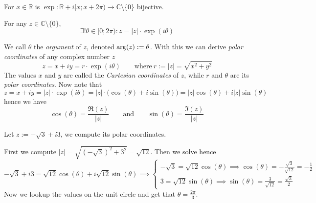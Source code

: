 \begin{theorem}
   For \(x \in \mathbb{R}\) is \(\exp: \mathbb{R} + i[x; x + 2\pi) \to \mathbb{C}\setminus\{0\}\) bijective.
\end{theorem}

\begin{theorem}
   For any \(z \in \mathbb{C}\setminus\{0\}\),
   \[\exists! \theta \in [0; 2\pi): z = \lvert z\rvert \cdot \exp(i \theta)\]
\end{theorem}
We call \(\theta\) the \emph{argument} of \(z\), denoted \(\operatorname{arg}(z) := \theta\).
With this we can derive \emph{polar coordinates} of any complex number \(z\)
\[z = x + iy = r \cdot \exp(i \theta) \qquad\text{where}~r := |z| = \sqrt{x^2 + y^2}\]
The values \(x\) and \(y\) are called the \emph{Cartesian coordinates} of \(z\), while \(r\) and \(\theta\) are its \emph{polar coordinates}.
Now note that
\[z = x + iy = \lvert z\rvert \cdot \exp(i \theta) = \lvert z \rvert \cdot \big(\cos(\theta) + i\sin(\theta)\big) = \lvert z\rvert\cos(\theta) + i\lvert z\rvert\sin(\theta)\]
hence we have
\[\cos(\theta) = \frac{\Re(z)}{\lvert z\rvert} \qquad\text{and}\qquad \sin(\theta) = \frac{\Im(z)}{\lvert z\rvert}\]
\begin{example}
   Let \(z := -\sqrt{3} + i3\), we compute its polar coordinates.

   First we compute \(\lvert z\rvert = \sqrt{(-\sqrt{3})^2 + 3^2} = \sqrt{12}\).
   Then we solve
   hence
   \[-\sqrt{3} + i3 = \sqrt{12}\cos(\theta) + i\sqrt{12}\sin(\theta) \implies \begin{cases}
         -\sqrt{3} = \sqrt{12}\cos(\theta) \implies \cos(\theta) = -\frac{\sqrt{3}}{\sqrt{12}} = -\frac{1}{2}\\
         3 = \sqrt{12}\sin(\theta) \implies \sin(\theta) = \frac{3}{\sqrt{12}} = \frac{\sqrt{3}}{2}
   \end{cases}\]
   Now we lookup the values on the unit circle and get that \(\theta = \frac{2\pi}{3}\).
\end{example}

%    

